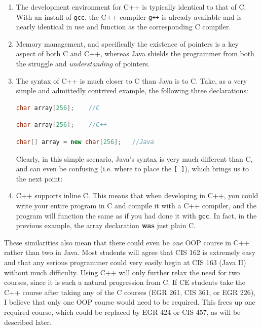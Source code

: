 \documentclass[12pt]{article}
\numberwithin{figure}{section}
\numberwithin{equation}{section}
\begin{document}
{\begin{enumerate}
\item   The development environment for C++ is typically identical to that of
        C. With an install of \texttt{gcc}, the C++ compiler \texttt{g++} is
        already available and is nearly identical in use and function as the
        corresponding C compiler.
\item   Memory management, and specifically the existence of pointers is a key
        aspect of both C and C++, whereas Java shields the programmer from
        both the struggle and \emph{understanding} of pointers.
\item   The syntax of C++ is much closer to C than Java is to C. Take, as a
        very simple and admittedly contrived example, the following three
        declarations:

\begin{lstlisting}[language=C,label=c-code]
    char array[256];    //C
\end{lstlisting}

\begin{lstlisting}[language=C++,label=c-code]
    char array[256];    //C++
\end{lstlisting}

\begin{lstlisting}[language=Java,label=c-code]
    char[] array = new char[256];   //Java
\end{lstlisting}

Clearly, in this simple scenario, Java's syntax is very much different
than C, and can even be confusing (i.e. where to place the
\texttt{{[} {]}}), which brings us to the next point:

\item   C++ supports inline C. This means that when developing in C++, you
        could write your entire program in C and compile it with a C++
        compiler, and the program will function the same as if you had done it
        with \texttt{gcc}. In fact, in the previous example, the array
        declaration \textbf{was} just plain C.
\end{enumerate}

These similarities also mean that there could even be \emph{one} OOP course in C++ rather than two in Java. Most students will agree that CIS 162 is extremely easy and that any serious programmer could very easily begin at CIS 163 (Java II) without much difficulty. Using C++ will only further relax the need for two courses, since it is such a natural progression from C. If CE students take the C++ course after taking any of the C courses (EGR 261, CIS 361, or EGR 226), I believe that only one OOP course would need to be required. This frees up one required course, which could be replaced by EGR 424 or CIS 457, as will be described later.

}
\end{document}

